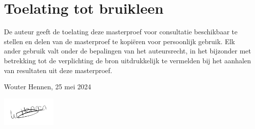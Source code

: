 \chapter*{Toelating tot bruikleen}
De auteur geeft de toelating deze masterproef voor consultatie beschikbaar te stellen en delen van de masterproef te kopiëren voor persoonlijk gebruik. Elk ander gebruik valt onder de bepalingen van het auteursrecht, in het bijzonder met betrekking tot de verplichting de bron uitdrukkelijk te vermelden bij het aanhalen van resultaten uit deze masterproef.


Wouter Hennen, 25 mei 2024

\includegraphics[width=0.2\textwidth]{images/signature.png}
